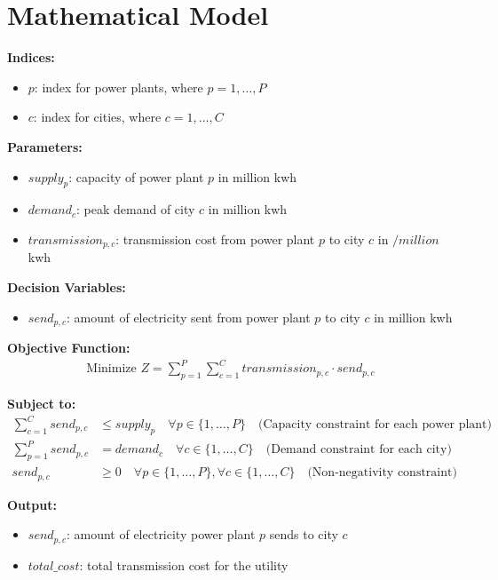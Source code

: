 \documentclass{article}
\begin{document}
\section*{Mathematical Model}

\textbf{Indices:}
\begin{itemize}
    \item $p$: index for power plants, where $p = 1, \ldots, P$
    \item $c$: index for cities, where $c = 1, \ldots, C$
\end{itemize}

\textbf{Parameters:}
\begin{itemize}
    \item $supply_{p}$: capacity of power plant $p$ in million kwh
    \item $demand_{c}$: peak demand of city $c$ in million kwh
    \item $transmission_{p,c}$: transmission cost from power plant $p$ to city $c$ in $/million$ kwh
\end{itemize}

\textbf{Decision Variables:}
\begin{itemize}
    \item $send_{p,c}$: amount of electricity sent from power plant $p$ to city $c$ in million kwh
\end{itemize}

\textbf{Objective Function:}
\begin{align*}
    \text{Minimize } Z = \sum_{p=1}^{P} \sum_{c=1}^{C} transmission_{p,c} \cdot send_{p,c}
\end{align*}

\textbf{Subject to:}
\begin{align*}
    \sum_{c=1}^{C} send_{p,c} & \leq supply_{p} \quad \forall p \in \{1, \ldots, P\} \quad \text{(Capacity constraint for each power plant)} \\
    \sum_{p=1}^{P} send_{p,c} & = demand_{c} \quad \forall c \in \{1, \ldots, C\} \quad \text{(Demand constraint for each city)} \\
    send_{p,c} & \geq 0 \quad \forall p \in \{1, \ldots, P\}, \forall c \in \{1, \ldots, C\} \quad \text{(Non-negativity constraint)}
\end{align*}

\textbf{Output:}
\begin{itemize}
    \item $send_{p,c}$: amount of electricity power plant $p$ sends to city $c$
    \item $total\_cost$: total transmission cost for the utility
\end{itemize}
\end{document}
